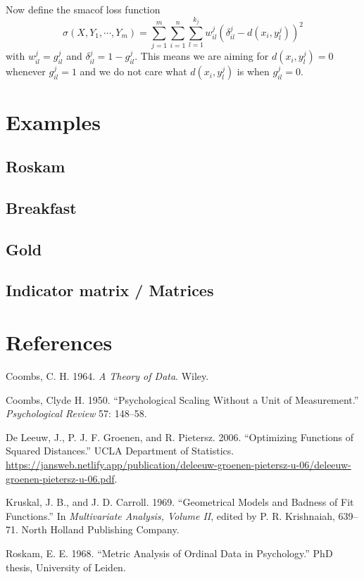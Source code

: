 \documentclass[
  12pt,
]{article}
\newlength{\cslhangindent}
\newenvironment{CSLReferences}[2] %
 {\begin{list}{}{%
  \setlength{\itemindent}{0pt}
  \setlength{\leftmargin}{0pt}
  \setlength{\parsep}{0pt}
  \ifodd #1
   \setlength{\leftmargin}{\cslhangindent}
   \setlength{\itemindent}{-1\cslhangindent}
  \fi
  \setlength{\itemsep}{#2\baselineskip}}}
 {\end{list}}
\begin{document}
Now define the smacof loss function
\[
\sigma(X,Y_1,\cdots,Y_m)=\sum_{j=1}^m\sum_{i=1}^n\sum_{l=1}^{k_j}w_{il}^j(\delta_{il}^j-d(x_i,y^j_l))^2
\]
with \(w_{il}^j=g_{il}^j\) and \(\delta_{il}^j=1-g_{il}^j\). This means we are
aiming for \(d(x_i,y^j_l)=0\) whenever \(g_{il}^j=1\) and we do not care what
\(d(x_i,y^j_l)\) is when \(g_{il}^j=0\).

\section{Examples}\label{examples}

\subsection{Roskam}\label{roskam}

\subsection{Breakfast}\label{breakfast}

\subsection{Gold}\label{gold}

\subsection{Indicator matrix / Matrices}\label{indicator-matrix-matrices}

\section*{References}\label{references}

\label{refs}
\begin{CSLReferences}{1}{0}
Coombs, C. H. 1964. \emph{{A Theory of Data}}. Wiley.

Coombs, Clyde H. 1950. {``Psychological Scaling Without a Unit of Measurement.''} \emph{Psychological Review} 57: 148--58.

De Leeuw, J., P. J. F. Groenen, and R. Pietersz. 2006. {``{Optimizing Functions of Squared Distances}.''} UCLA Department of Statistics. \url{https://jansweb.netlify.app/publication/deleeuw-groenen-pietersz-u-06/deleeuw-groenen-pietersz-u-06.pdf}.

Kruskal, J. B., and J. D. Carroll. 1969. {``{Geometrical Models and Badness of Fit Functions}.''} In \emph{Multivariate Analysis, Volume II}, edited by P. R. Krishnaiah, 639--71. North Holland Publishing Company.

Roskam, E. E. 1968. {``{Metric Analysis of Ordinal Data in Psychology}.''} PhD thesis, University of Leiden.

\end{CSLReferences}
\end{document}
